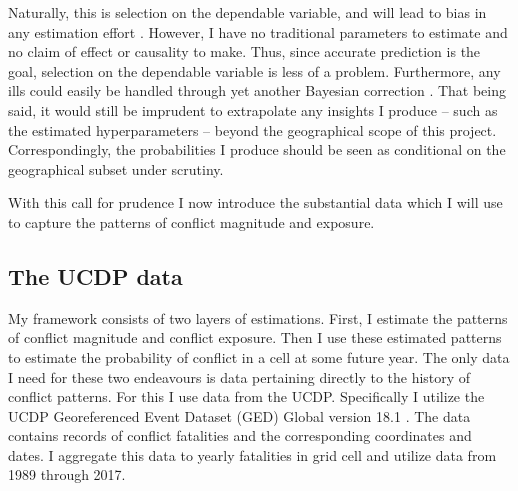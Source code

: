 \documentclass[a4paper]{article}
\begin{document}
Naturally, this is selection on the dependable variable, and will lead to bias in any estimation effort \citep[129-130]{king1994designing}. However, I have no traditional parameters to estimate and no claim of effect or causality to make. Thus, since accurate prediction is the goal, selection on the dependable variable is less of a problem. Furthermore, any ills could easily be handled through yet another Bayesian correction \citep[627-628]{King_Zeng_2001}. That being said, it would still be imprudent to extrapolate any insights I produce -- such as the estimated hyperparameters -- beyond the geographical scope of this project. Correspondingly, the probabilities I produce should be seen as conditional on the geographical subset under scrutiny.\par


With this call for prudence I now introduce the substantial data which I will use to capture the patterns of conflict magnitude and exposure.\par

\subsection{The UCDP data}



My framework consists of two layers of estimations. First, I estimate the patterns of conflict magnitude and conflict exposure. Then I use these estimated patterns to estimate the probability of conflict in a cell at some future year. The only data I need for these two endeavours is data pertaining directly to the history of conflict patterns. For this I use data from the UCDP. Specifically I utilize the UCDP Georeferenced Event Dataset (GED) Global version 18.1 \citep{UCDP_2017}. The data contains records of conflict fatalities and the corresponding coordinates and dates. I aggregate this data to yearly fatalities in grid cell and utilize data from 1989 through 2017.\par 
\end{document}
